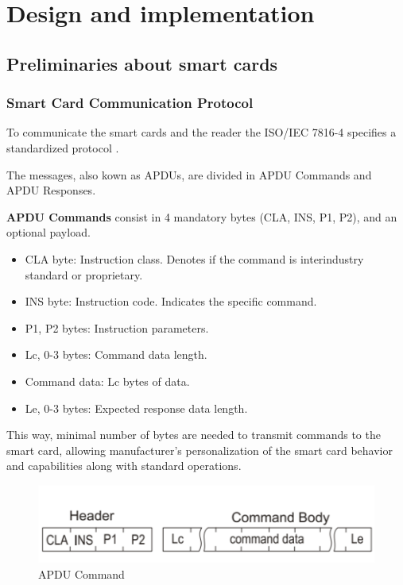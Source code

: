 \chapter{Design and implementation}\label{ch:design}






\section{Preliminaries about smart cards}


\subsection{Smart Card Communication Protocol}

To communicate the smart cards and the reader the ISO/IEC 7816-4 \citep{APDUISO} specifies a standardized protocol .

The messages, also kown as \acp{APDU}, are divided in APDU Commands and APDU Responses.

\textbf{APDU Commands} consist in 4 mandatory bytes (CLA, INS, P1, P2), and an optional payload.

\begin{itemize}
	\item CLA byte: Instruction class. Denotes if the command is interindustry standard or proprietary.
	\item INS byte: Instruction code. Indicates the specific command.
	\item P1, P2 bytes: Instruction parameters.
	\item Lc, 0-3 bytes: Command data length.
	\item Command data: Lc bytes of data.
	\item Le, 0-3 bytes: Expected response data length.
\end{itemize}

This way, minimal number of bytes are needed to transmit commands to the smart card, allowing manufacturer's personalization of the smart card behavior and capabilities along with standard operations.

\begin{figure}[bth]
	\begin{center}
		\includegraphics[width=0.55\linewidth]{gfx/APDUCommand}
	\end{center}
	\caption{APDU Command}
	\label{fig:APDUCommand}
\end{figure}


